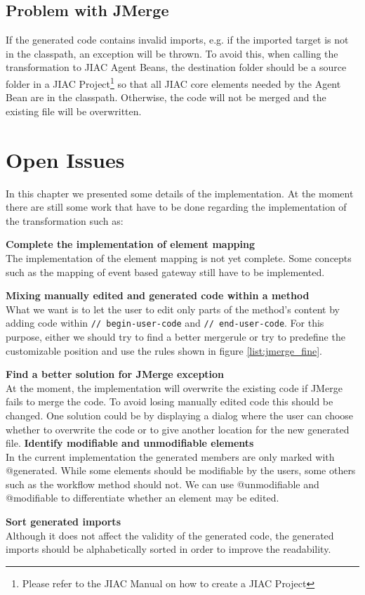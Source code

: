 \subsection{Problem with JMerge}
If the generated code contains invalid imports, e.g. if the imported target is not in the classpath, an exception will be thrown. 
To avoid this, when calling the transformation to JIAC Agent Beans, the destination folder should be a source folder in a JIAC Project\footnote{Please refer to the JIAC Manual\cite{JIACMAN10} on how to create a JIAC Project} so that all JIAC core elements needed by the Agent Bean are in the classpath. Otherwise, the code will not be merged and the existing file will be overwritten. 
\section{Open Issues}
\label{sec:opi}
In this chapter we presented some details of the implementation. At the moment there are still some work that have to be done regarding the implementation of the transformation such as:

\textbf{Complete the implementation of element mapping }\\
The implementation of the element mapping is not yet complete. Some concepts such as the mapping of event based gateway still have to be implemented. 

\textbf{Mixing manually edited and generated code within a method}\\
What we want is to let the user to edit only parts of the method's content by adding code within \verb|// begin-user-code| and \verb|// end-user-code|. For this purpose, either we should try to find a better mergerule or try to predefine the customizable position and use the rules shown in figure \ref{list:jmerge_fine}.

\textbf{Find a better solution for JMerge exception}\\
At the moment, the implementation will overwrite the existing code if JMerge fails to merge the code. To avoid losing manually edited code this should be changed. One solution could be by displaying a dialog where the user can choose whether to overwrite the code or to give another location for the new generated file. 
\newpage
\textbf{Identify modifiable and unmodifiable elements}\\
In the current implementation the generated members are only marked with @generated. While some elements should be modifiable by the users, some others such as the workflow method should not. We can use @unmodifiable and @modifiable to differentiate whether an element may be edited. 

\textbf{Sort generated imports}\\
Although it does not affect the validity of the generated code, the generated imports should be alphabetically sorted in order to improve the readability.




